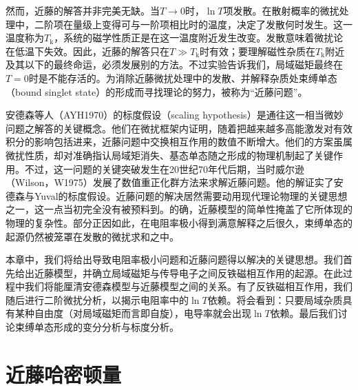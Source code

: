 然而，近藤的解答并非完美无缺。当$T\to 0$时，$\ln T$项发散。在散射概率的微扰处理中，二阶项在量级上变得可与一阶项相比时的温度，决定了发散何时发生。这一温度称为$T_{\mathrm{k}}$，系统的磁学性质正是在这一温度附近发生改变。发散意味着微扰论在低温下失效。因此，近藤的解答只在$T\gg T_{\mathrm{k}}$时有效；要理解磁性杂质在$T_{\mathrm{k}}$附近及其以下的最终命运，必须发展别的方法。不过实验告诉我们，局域磁矩最终在$T=0$时是不能存活的。为消除近藤微扰处理中的发散、并解释杂质处束缚单态（bound singlet state）的形成而寻找理论的努力，被称为“近藤问题”。

安德森等人（AYH1970）的标度假设（scaling hypothesis）是通往这一相当微妙问题之解答的关键概念。他们在微扰框架内证明，随着把越来越多高能激发对有效积分的影响包括进来，近藤问题中交换相互作用的数值不断增大。他们的方案虽属微扰性质，却对准确指认局域矩消失、基态单态随之形成的物理机制起了关键作用。不过，这一问题的关键突破发生在20世纪70年代后期，当时威尔逊（Wilson，W1975）发展了数值重正化群方法来求解近藤问题。他的解证实了安德森与Yuval的标度假设。近藤问题的解决居然需要动用现代理论物理的关键思想之一，这一点当初完全没有被预料到。的确，近藤模型的简单性掩盖了它所体现的物理的复杂性。部分正因如此，在电阻率极小得到满意解释之后很久，束缚单态的起源仍然被笼罩在发散的微扰求和之中。

本章中，我们将给出导致电阻率极小问题和近藤问题得以解决的关键思想。我们首先给出近藤模型，并确立局域磁矩与传导电子之间反铁磁相互作用的起源。在此过程中我们将能厘清安德森模型与近藤模型之间的关系。有了反铁磁相互作用，我们随后进行二阶微扰分析，以揭示电阻率中的$\ln T$依赖。将会看到：只要局域杂质具有某种自由度（对局域磁矩而言即自旋），电导率就会出现$\ln T$依赖。最后我们讨论束缚单态形成的变分分析与标度分析。

\section{近藤哈密顿量}

